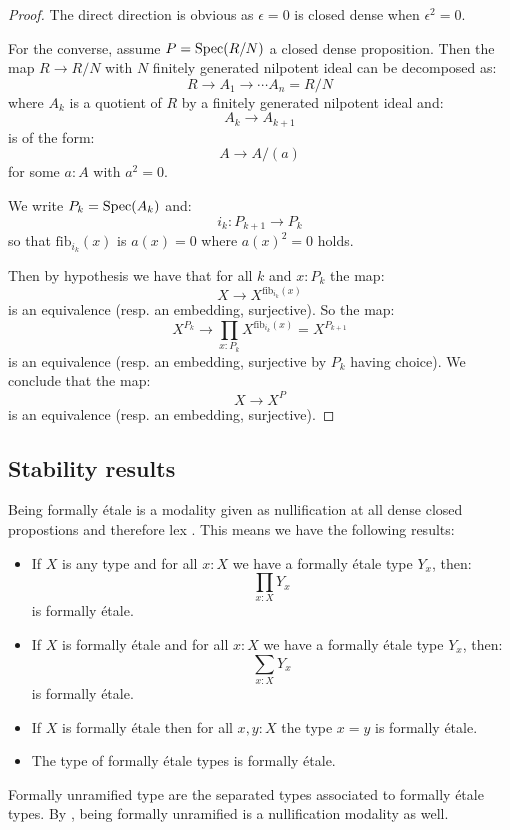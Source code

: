 \begin{proof}
The direct direction is obvious as $\epsilon=0$ is closed dense when $\epsilon^2=0$.

For the converse, assume $P=\operatorname{Spec}(R/N)$ a closed dense proposition. Then the map $R\to R/N$ with $N$ finitely generated nilpotent ideal can be decomposed as:
\[R\to A_1\to \cdots A_n = R/N\]
where $A_k$ is a quotient of $R$ by a finitely generated nilpotent ideal and:
\[A_k\to A_{k+1}\]
is of the form:
\[A\to A/(a)\]
for some $a:A$ with $a^2=0$.

We write $P_k = \operatorname{Spec}(A_k)$ and:
\[i_k:P_{k+1}\to P_k\] 
so that $\mathrm{fib}_{i_k}(x)$ is $a(x)=0$ where $a(x)^2=0$ holds.

Then by hypothesis we have that for all $k$ and $x:P_{k}$ the map:
\[X\to X^{\mathrm{fib}_{i_k}(x)}\]
is an equivalence (resp. an embedding, surjective). So the map:
\[X^{P_{k}} \to \prod_{x:P_{k}}X^{\mathrm{fib}_{i_k}(x)} = X^{P_{k+1}}\]
is an equivalence (resp. an embedding, surjective by $P_{k}$ having choice).
We conclude that the map:
\[X\to X^P\]
is an equivalence (resp. an embedding, surjective).
\end{proof}



\subsection{Stability results}

Being formally étale is a modality given as nullification at all dense closed propostions and therefore lex \cite[Corollary 3.12]{modalities}.
This means we have the following results:

\begin{proposition}
\begin{itemize}
\item If $X$ is any type and for all $x:X$ we have a formally étale type $Y_x$, then:
\[\prod_{x:X}Y_x\]
is formally étale. 
\item  If $X$ is formally étale and for all $x:X$ we have a formally étale type $Y_x$, then:
\[\sum_{x:X}Y_x\]
is formally étale. 
\item If $X$ is formally étale then for all $x,y : X$ the type $x=y$ is formally étale.
\item The type of formally étale types is formally étale.
\end{itemize}
\end{proposition}

Formally unramified type are the separated types \cite[Definition 2.13]{localization} associated to formally étale types.
By \cite[Lemma 2.15]{localization}, being formally unramified is a nullification modality as well.

